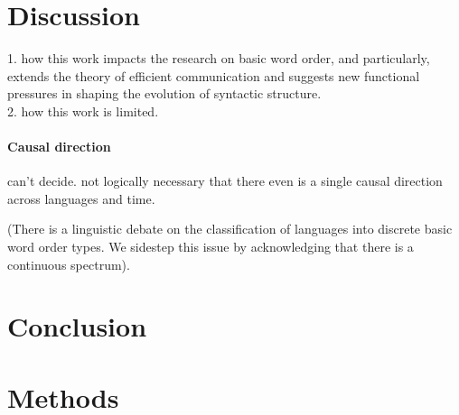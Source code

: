 \documentclass[11pt,a4paper]{article}
\begin{document}









\section{Discussion}

{\color{blue} 1. how this work impacts the research on basic word order, and particularly, extends the theory of efficient communication and suggests new functional pressures in shaping the evolution of syntactic structure.}\\

{\color{blue} 2. how this work is limited.} \paragraph{Causal direction} can't decide. not logically necessary that there even is a single causal direction across languages and time.


(There is a linguistic debate on the classification of languages into discrete basic word order types. We sidestep this issue by acknowledging that there is a continuous spectrum).


\section{Conclusion}

\section*{Methods}
\end{document}
